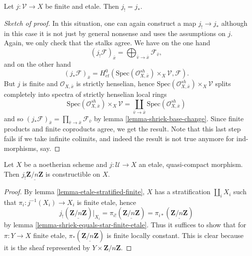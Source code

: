 \begin{lemma}
\label{lemma-shriek-equals-star-finite-etale}
Let $j: \mathcal{V}\to X$ be finite and etale. Then $j_! = j_*$.
\end{lemma}

\begin{proof}[Sketch of proof]
In this situation, one can again construct a map $j_! \to j_*$ although in this
case it is not just by general nonsense and uses the assumptions on $j$. Again,
we only check that the stalks agree. We have on the one hand
$$
(j_!\mathcal{F})_{\bar x} =
\bigoplus_{\bar v \to \bar x} \mathcal{F}_{\bar v},
$$
and on the other hand
$$
\left(j_* \mathcal{F} \right)_{\bar x} = H_{et}^0(\text{Spec}(\mathcal{O}_{X,
\bar x}^{sh})\times_X \mathcal{V}, \mathcal{F}).
$$
But $j$ is finite and $\mathcal{O}_{X, \bar x}$ is strictly henselian, hence
$\text{Spec}(\mathcal{O}_{X, \bar x}^{sh})\times_X \mathcal{V}$ splits
completely into spectra of strictly henselian local rings
$$
\text{Spec}(\mathcal{O}_{X, \bar x}^{sh})\times_X \mathcal{V} =
\coprod_{\bar v \to \bar x} \text{Spec}(\mathcal{O}_{X, \bar x}^{sh})
$$
and so $\left(j_* \mathcal{F} \right)_{\bar x} = \prod_{\bar v \to \bar
x} \mathcal{F}_{\bar v}$ by lemma \ref{lemma-shriek-base-change}. Since
finite products and finite coproducts agree, we get the result. Note that this
last step fails if we take infinite colimits, and indeed the result is not true
anymore for ind-morphisms, say.
\end{proof}

\begin{lemma}
\label{lemma-jshriek-constructible}
Let $X$ be a noetherian scheme and $j: \mathcal{U} \to X$ an etale,
quasi-compact morphism. Then $j_!\underline{\mathbf{Z}/n\mathbf{Z}}$ is
constructible on $X$.
\end{lemma}

\begin{proof}
By lemma \ref{lemma-etale-stratified-finite}, $X$ has a stratification
$\coprod_i X_i$ such that $\pi_i: j^{-1}(X_i)\to X_i$ is finite etale, hence
$$
j_!(\underline{\mathbf{Z}/n\mathbf{Z}})|_{X_i} =
\pi_{i!}(\underline{\mathbf{Z}/n\mathbf{Z}}) =
\pi_{i*}(\underline{\mathbf{Z}/n\mathbf{Z}})
$$
by lemma \ref{lemma-shriek-equals-star-finite-etale}. Thus it suffices to show
that for $\pi: Y\to X$ finite etale,
$\pi_*(\underline{\mathbf{Z}/n\mathbf{Z}})$ is finite locally constant. This is
clear because it is the sheaf represented by $Y\times \mathbf{Z}/n\mathbf{Z}$.
\end{proof}

